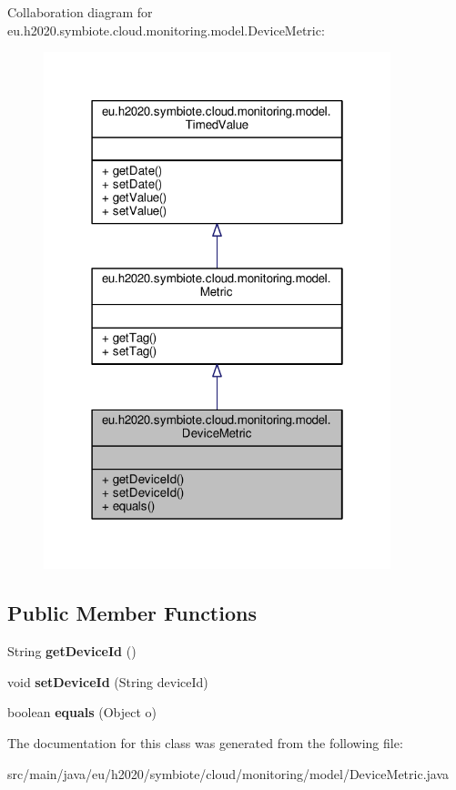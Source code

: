 Collaboration diagram for eu.\+h2020.\+symbiote.\+cloud.\+monitoring.\+model.\+Device\+Metric\+:\nopagebreak
\begin{figure}[H]
\begin{center}
\leavevmode
\includegraphics[width=286pt]{classeu_1_1h2020_1_1symbiote_1_1cloud_1_1monitoring_1_1model_1_1DeviceMetric__coll__graph}
\end{center}
\end{figure}
\subsection*{Public Member Functions}
\begin{DoxyCompactItemize}
\item 
\mbox{\label{classeu_1_1h2020_1_1symbiote_1_1cloud_1_1monitoring_1_1model_1_1DeviceMetric_a3837f81730f0f73e24012f3755080e21}} 
String {\bfseries get\+Device\+Id} ()
\item 
\mbox{\label{classeu_1_1h2020_1_1symbiote_1_1cloud_1_1monitoring_1_1model_1_1DeviceMetric_ab309ce6c905d6c372857386983b5a025}} 
void {\bfseries set\+Device\+Id} (String device\+Id)
\item 
\mbox{\label{classeu_1_1h2020_1_1symbiote_1_1cloud_1_1monitoring_1_1model_1_1DeviceMetric_a450a1568d87b9c5b12a04935fab4bb44}} 
boolean {\bfseries equals} (Object o)
\end{DoxyCompactItemize}


The documentation for this class was generated from the following file\+:\begin{DoxyCompactItemize}
\item 
src/main/java/eu/h2020/symbiote/cloud/monitoring/model/Device\+Metric.\+java\end{DoxyCompactItemize}
